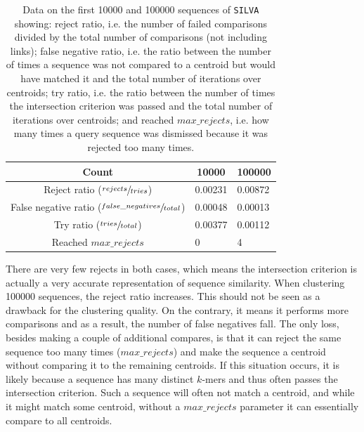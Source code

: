 \begin{table}[h!]
  \centering
  \begin{tabular}{c||l|l}
  Count                                                    & \multicolumn{1}{c|}{\num{10000}} & \multicolumn{1}{c}{\num{100000}} \\
  \hline\hline
  Reject ratio ($\sfrac{rejects}{tries}$)                  & 0.00231                          & 0.00872                          \\
  \hline
  False negative ratio ($\sfrac{false\_negatives}{total}$) & 0.00048                          & 0.00013                          \\
  \hline
  Try ratio ($\sfrac{tries}{total}$)                       & 0.00377                          & 0.00112                          \\
  \hline
  Reached $max\_rejects$                                   & 0                                & 4                                \\
  \end{tabular}
  \caption{Data on the first \num{10000} and \num{100000} sequences of
  \texttt{SILVA} showing: reject ratio, i.e. the number of failed comparisons
  divided by the total number of comparisons (not including links); false
  negative ratio, i.e. the ratio between the number of times a sequence was not
  compared to a centroid but would have matched it and the total number of
  iterations over centroids; try ratio, i.e. the ratio between the number of
  times the intersection criterion was passed and the total number of
  iterations over centroids; and reached $max\_rejects$, i.e. how many times a
  query sequence was dismissed because it was rejected too many times.}
  \label{tab:centroid_search_data}
\end{table}

There are very few rejects in both cases, which means the intersection
criterion is actually a very accurate representation of sequence similarity.
When clustering \num{100000} sequences, the reject ratio increases. This should
not be seen as a drawback for the clustering quality. On the contrary, it means
it performs more comparisons and as a result, the number of false negatives
fall. The only loss, besides making a couple of additional compares, is that it
can reject the same sequence too many times ($max\_rejects$) and make the
sequence a centroid without comparing it to the remaining centroids. If this
situation occurs, it is likely because a sequence has many distinct $k$-mers
and thus often passes the intersection criterion. Such a sequence will often
not match a centroid, and while it might match some centroid, without a
$max\_rejects$ parameter it can essentially compare to all centroids.

